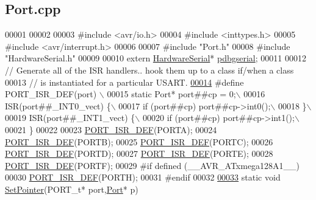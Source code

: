\hypertarget{_port_8cpp_source}{
\subsection{Port.cpp}
}

\begin{DoxyCode}
00001 
00002 
00003 \textcolor{preprocessor}{#include <avr/io.h>}
00004 \textcolor{preprocessor}{#include <inttypes.h>}
00005 \textcolor{preprocessor}{#include <avr/interrupt.h>}
00006 
00007 \textcolor{preprocessor}{#include "Port.h"}
00008 \textcolor{preprocessor}{#include "HardwareSerial.h"}
00009 
00010 \textcolor{keyword}{extern} \hyperlink{class_hardware_serial}{HardwareSerial}* \hyperlink{_gyro_acc_8cpp_a953e918236b1fd18b8f07bad1217ecbe}{pdbgserial};
00011 
00012 \textcolor{comment}{// Generate all of the ISR handlers.. hook them up to a class if/when a class}
00013 \textcolor{comment}{// is instantiated for a particular USART.}
\hypertarget{_port_8cpp_source_l00014}{}\hyperlink{_port_8cpp_a98ed3f9bf909d32905f2c879381dc501}{00014} \textcolor{preprocessor}{#define PORT\_ISR\_DEF(port) \(\backslash\)}
00015 \textcolor{preprocessor}{static Port*  port##cp = 0;\(\backslash\)}
00016 \textcolor{preprocessor}{ISR(port##\_INT0\_vect) \{\(\backslash\)}
00017 \textcolor{preprocessor}{    if (port##cp) port##cp->int0();\(\backslash\)}
00018 \textcolor{preprocessor}{\}\(\backslash\)}
00019 \textcolor{preprocessor}{ISR(port##\_INT1\_vect) \{\(\backslash\)}
00020 \textcolor{preprocessor}{    if (port##cp) port##cp->int1();\(\backslash\)}
00021 \textcolor{preprocessor}{\}}
00022 \textcolor{preprocessor}{}
00023 \hyperlink{_port_8cpp_a98ed3f9bf909d32905f2c879381dc501}{PORT_ISR_DEF}(PORTA);
00024 \hyperlink{_port_8cpp_a98ed3f9bf909d32905f2c879381dc501}{PORT_ISR_DEF}(PORTB);
00025 \hyperlink{_port_8cpp_a98ed3f9bf909d32905f2c879381dc501}{PORT_ISR_DEF}(PORTC);
00026 \hyperlink{_port_8cpp_a98ed3f9bf909d32905f2c879381dc501}{PORT_ISR_DEF}(PORTD);
00027 \hyperlink{_port_8cpp_a98ed3f9bf909d32905f2c879381dc501}{PORT_ISR_DEF}(PORTE);
00028 \hyperlink{_port_8cpp_a98ed3f9bf909d32905f2c879381dc501}{PORT_ISR_DEF}(PORTF);
00029 \textcolor{preprocessor}{#if defined (\_\_AVR\_ATxmega128A1\_\_)}
00030 \textcolor{preprocessor}{}\hyperlink{_port_8cpp_a98ed3f9bf909d32905f2c879381dc501}{PORT_ISR_DEF}(PORTH);
00031 \textcolor{preprocessor}{#endif}
00032 \textcolor{preprocessor}{}
\hypertarget{_port_8cpp_source_l00033}{}\hyperlink{_port_8cpp_afaf5d589e6cb241cd3822efd8c9cbb05}{00033} \textcolor{keyword}{static} \textcolor{keywordtype}{void} \hyperlink{_port_8cpp_afaf5d589e6cb241cd3822efd8c9cbb05}{SetPointer}(PORT\_t* port,\hyperlink{class_port}{Port}* p)

\end{DoxyCode}
